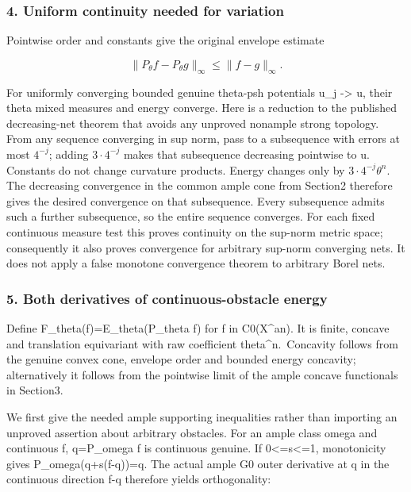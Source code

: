 \documentclass[
]{article}
\begin{document}
\subsubsection{4. Uniform continuity needed for
variation}\label{uniform-continuity-needed-for-variation}

Pointwise order and constants give the original envelope estimate

\[\|P_\theta f-P_\theta g\|_\infty\leq\|f-g\|_\infty.\]

For uniformly converging bounded genuine theta-psh potentials u\_j
-\textgreater{} u, their theta mixed measures and energy converge. Here
is a reduction to the published decreasing-net theorem that avoids any
unproved nonample strong topology. From any sequence converging in sup
norm, pass to a subsequence with errors at most \(4^{-j}\); adding
\(3\cdot4^{-j}\) makes that subsequence decreasing pointwise to u.
Constants do not change curvature products. Energy changes only by
\(3\cdot4^{-j}\theta^n\). The decreasing convergence in the common ample
cone from Section2 therefore gives the desired convergence on that
subsequence. Every subsequence admits such a further subsequence, so the
entire sequence converges. For each fixed continuous measure test this
proves continuity on the sup-norm metric space; consequently it also
proves convergence for arbitrary sup-norm converging nets. It does not
apply a false monotone convergence theorem to arbitrary Borel nets.

\subsubsection{5. Both derivatives of continuous-obstacle
energy}\label{both-derivatives-of-continuous-obstacle-energy}

Define F\_theta(f)=E\_theta(P\_theta f) for f in C0(X\^{}an). It is
finite, concave and translation equivariant with raw coefficient
theta\^{}n.~Concavity follows from the genuine convex cone, envelope
order and bounded energy concavity; alternatively it follows from the
pointwise limit of the ample concave functionals in Section3.

We first give the needed ample supporting inequalities rather than
importing an unproved assertion about arbitrary obstacles. For an ample
class omega and continuous f, q=P\_omega f is continuous genuine. If
0\textless=s\textless=1, monotonicity gives P\_omega(q+s(f-q))=q. The
actual ample G0 outer derivative at q in the continuous direction f-q
therefore yields orthogonality:
\end{document}
